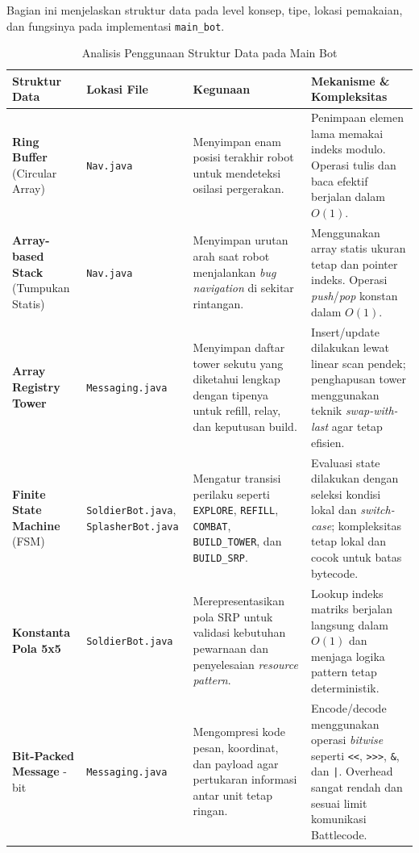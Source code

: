 Bagian ini menjelaskan struktur data pada level konsep, tipe, lokasi pemakaian, dan fungsinya pada implementasi \texttt{main\_bot}.
\begin{table}[htbp]
	\centering
	\renewcommand{\arraystretch}{1.5}
	\begin{tabular}{|p{3.5cm}|p{3.5cm}|p{4cm}|p{4cm}|}
		\hline
		\textbf{Struktur Data} & \textbf{Lokasi File} & \textbf{Kegunaan} & \textbf{Mekanisme \& Kompleksitas} \\
		\hline
		\textbf{Ring Buffer} \newline (Circular Array) & \texttt{Nav.java} & Menyimpan enam posisi terakhir robot untuk mendeteksi osilasi pergerakan. & Penimpaan elemen lama memakai indeks modulo. Operasi tulis dan baca efektif berjalan dalam $O(1)$. \\
		\hline
		\textbf{Array-based Stack} \newline (Tumpukan Statis) & \texttt{Nav.java} & Menyimpan urutan arah saat robot menjalankan \textit{bug navigation} di sekitar rintangan. & Menggunakan array statis ukuran tetap dan pointer indeks. Operasi \textit{push}/\textit{pop} konstan dalam $O(1)$. \\
		\hline
		\textbf{Array Registry Tower} & \texttt{Messaging.java} & Menyimpan daftar tower sekutu yang diketahui lengkap dengan tipenya untuk refill, relay, dan keputusan build. & Insert/update dilakukan lewat linear scan pendek; penghapusan tower menggunakan teknik \textit{swap-with-last} agar tetap efisien. \\
		\hline
		\textbf{Finite State Machine} \newline (FSM) & \texttt{SoldierBot.java}, \texttt{SplasherBot.java} & Mengatur transisi perilaku seperti \texttt{EXPLORE}, \texttt{REFILL}, \texttt{COMBAT}, \texttt{BUILD\_TOWER}, dan \texttt{BUILD\_SRP}. & Evaluasi state dilakukan dengan seleksi kondisi lokal dan \textit{switch-case}; kompleksitas tetap lokal dan cocok untuk batas bytecode. \\
		\hline
		\textbf{Konstanta Pola 5x5} & \texttt{SoldierBot.java} & Merepresentasikan pola SRP untuk validasi kebutuhan pewarnaan dan penyelesaian \textit{resource pattern}. & Lookup indeks matriks berjalan langsung dalam $O(1)$ dan menjaga logika pattern tetap deterministik. \\
		\hline
		\textbf{Bit-Packed Message} \newline 32-bit & \texttt{Messaging.java} & Mengompresi kode pesan, koordinat, dan payload agar pertukaran informasi antar unit tetap ringan. & Encode/decode menggunakan operasi \textit{bitwise} seperti \texttt{<<}, \texttt{>>>}, \texttt{\&}, dan \texttt{|}. Overhead sangat rendah dan sesuai limit komunikasi Battlecode. \\
		\hline
	\end{tabular}
	\caption{Analisis Penggunaan Struktur Data pada Main Bot}
\end{table}

